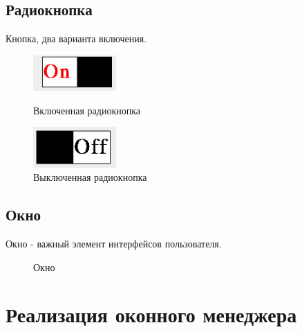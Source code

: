 \documentclass[14pt]{extarticle}
\begin{document}
	\subsection{Радиокнопка}
		Кнопка, два варианта включения.
		\begin{figure}[h]
		\begin{center}
		\begin{minipage}[h]{0.4\linewidth}
		\includegraphics[width=90pt]{pictures/toggleButton1.png}
		\caption{ Включенная радиокнопка} %
		\label{ris:b1} %
		\end{minipage}
		\hfill 
		\begin{minipage}[h]{0.4\linewidth}
		\includegraphics[width=90pt]{pictures/toggleButton2.png}
		\caption{Выключенная радиокнопка}
		\label{ris:b2}
		\end{minipage}
		\end{center}
		\end{figure}
	\subsection{Окно}
	Окно - важный элемент интерфейсов пользователя.
		\begin{figure}[h]
		\caption{ Окно }
		\label{ris:image}
		\end{figure}	
	\pagebreak
	\section{Реализация оконного менеджера}
\end{document}
